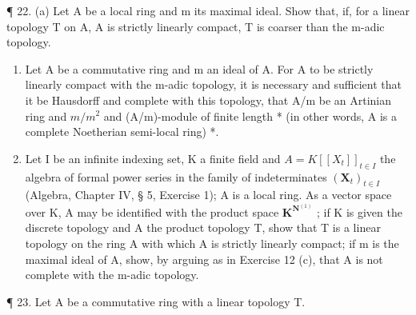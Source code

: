 ¶ 22. (a) Let A be a local ring and m its maximal ideal. Show that, if, for a linear topology T on A, A is strictly linearly compact, T is coarser than the m-adic topology.

\begin{enumerate}
\def\labelenumi{(\alph{enumi})}
\setcounter{enumi}{1}
\item
  Let A be a commutative ring and m an ideal of A. For A to be strictly linearly compact with the m-adic topology, it is necessary and sufficient that it be Hausdorff and complete with this topology, that A/m be an Artinian ring and \(m/m^{2}\) and (A/m)-module of finite length * (in other words, A is a complete Noetherian semi-local ring) *.
\item
  Let I be an infinite indexing set, K a finite field and \(A = K[[X_{t}]]_{t \in I}\) the algebra of formal power series in the family of indeterminates \((\mathbf{X}_{t})_{t \in I}\) (Algebra, Chapter IV, § 5, Exercise 1); A is a local ring. As a vector space over K, A may be identified with the product space \(\mathbf{K}^{\mathbf{N}^{(1)}}\) ; if K is given the discrete topology and A the product topology T, show that T is a linear topology on the ring A with which A is strictly linearly compact; if m is the maximal ideal of A, show, by arguing as in Exercise 12 (c), that A is not complete with the m-adic topology.
\end{enumerate}

¶ 23. Let A be a commutative ring with a linear topology T.

